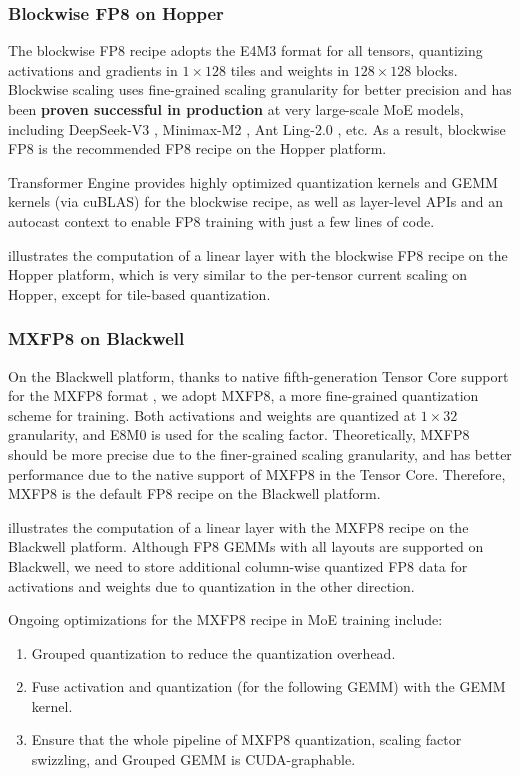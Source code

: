 \documentclass[10pt,logo,copyright]{nvidiatechreport}
\begin{document}
\subsubsection{Blockwise FP8 on Hopper}
The blockwise FP8 recipe adopts the E4M3 format for all tensors, quantizing activations and gradients in $1 \times 128$ tiles and weights in $128 \times 128$ blocks. Blockwise scaling uses fine-grained scaling granularity for better precision and has been \textbf{proven successful in production} at very large-scale MoE models, including DeepSeek-V3 \cite{deepseekai2025deepseekv3technicalreport}, Minimax-M2 \cite{minimax_m2}, Ant Ling-2.0 \cite{li2025every}, etc. As a result, blockwise FP8 is the recommended FP8 recipe on the Hopper platform.

Transformer Engine provides highly optimized quantization kernels and GEMM kernels (via cuBLAS) for the blockwise recipe, as well as layer-level APIs and an autocast context to enable FP8 training with just a few lines of code.

 illustrates the computation of a linear layer with the blockwise FP8 recipe on the Hopper platform, which is very similar to the per-tensor current scaling on Hopper, except for tile-based quantization.

\subsubsection{MXFP8 on Blackwell}
On the Blackwell platform, thanks to native fifth-generation Tensor Core support for the MXFP8 format \cite{rouhani2023microscalingdataformatsdeep}, we adopt MXFP8, a more fine-grained quantization scheme for training. Both activations and weights are quantized at $1 \times 32$ granularity, and E8M0 is used for the scaling factor. Theoretically, MXFP8 should be more precise due to the finer-grained scaling granularity, and has better performance due to the native support of MXFP8 in the Tensor Core. Therefore, MXFP8 is the default FP8 recipe on the Blackwell platform.

 illustrates the computation of a linear layer with the MXFP8 recipe on the Blackwell platform. Although FP8 GEMMs with all layouts are supported on Blackwell, we need to store additional column-wise quantized FP8 data for activations and weights due to quantization in the other direction.

Ongoing optimizations for the MXFP8 recipe in MoE training include:
\begin{enumerate}
    \item Grouped quantization to reduce the quantization overhead.
    \item Fuse activation and quantization (for the following GEMM) with the GEMM kernel.
    \item Ensure that the whole pipeline of MXFP8 quantization, scaling factor swizzling, and Grouped GEMM is CUDA-graphable.
\end{enumerate}
\end{document}

